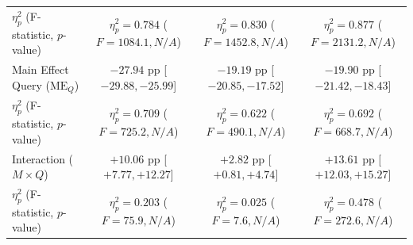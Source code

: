 \begin{table}[!htbp]
{\begin{tabular}{lccc}
$\eta_p^2$ (F-statistic, $p$-value) & $\eta_p^2 = 0.784$ ($F=1084.1, N/A$) & $\eta_p^2 = 0.830$ ($F=1452.8, N/A$) & $\eta_p^2 = 0.877$ ($F=2131.2, N/A$) \\
Main Effect Query ($\text{ME}_Q$) & $-27.94$ pp [$-29.88, -25.99$] & $-19.19$ pp [$-20.85, -17.52$] & $-19.90$ pp [$-21.42, -18.43$] \\
$\eta_p^2$ (F-statistic, $p$-value) & $\eta_p^2 = 0.709$ ($F=725.2, N/A$) & $\eta_p^2 = 0.622$ ($F=490.1, N/A$) & $\eta_p^2 = 0.692$ ($F=668.7, N/A$) \\
Interaction ($M \times Q$) & $+10.06$ pp [$+7.77, +12.27$] & $+2.82$ pp [$+0.81, +4.74$] & $+13.61$ pp [$+12.03, +15.27$] \\
$\eta_p^2$ (F-statistic, $p$-value) & $\eta_p^2 = 0.203$ ($F=75.9, N/A$) & $\eta_p^2 = 0.025$ ($F=7.6, N/A$) & $\eta_p^2 = 0.478$ ($F=272.6, N/A$) \\
\bottomrule
\end{tabular}%
}
\end{table}


\begin{table}[!htbp]
\centering
\caption{ANOVA Factorial Decomposition and Interventional-Protocol Attribution across Attack Formulations on COCO val2017 ($640 \times 640$; evaluation cohort $N = 300$ images, valid intra-subject $N = 299$, $\text{df}_1 = 1, \text{df}_2 = 298$). Highlights that query prior displacement represents an essential secondary protocol attribution under AQSM ($\eta_p^2 = 0.709$), in contrast to Query Vanishing where degradation concentrates in memory ($\eta_p^2 = 0.830$).}
\label{tab:tab4_anova_decomp}
\end{table}


